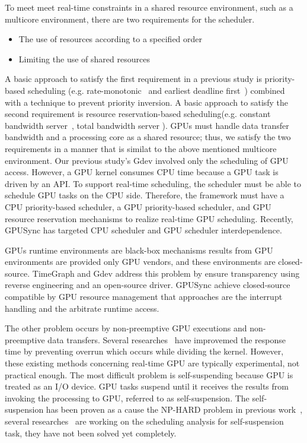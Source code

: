 To meet meet real-time constraints in a shared resource environment, such as a multicore environment,
there are two requirements for the scheduler.
\begin{itemize}
\item The use of resources according to a specified order
\item Limiting the use of shared resources
\end{itemize}
A basic approach to satisfy the first requirement in a previous study is priority-based scheduling (e.g. rate-monotonic~\cite{sched:rm} and earliest deadline first~\cite{sched:edf}) combined with a technique to prevent priority inversion.
A basic approach to satisfy the second requirement is resource reservation-based scheduling(e.g. constant bandwidth server~\cite{rr:cbs}, total bandwidth server\cite{rr:tbs2} ).
GPUs must handle data transfer bandwidth and a processing core as a shared resource; thus, we satisfy the two requirements in a manner that is similat to the above mentioned multicore environment.
Our previous study's Gdev involved only the scheduling of GPU access.
However, a GPU kernel consumes CPU time because a GPU task is driven by an API.
To support real-time scheduling, the scheduler must be able to schedule GPU tasks on the CPU side.
Therefore, the framework must have a CPU priority-based scheduler, a GPU priority-based scheduler, and GPU resource reservation mechanisms to realize real-time GPU scheduling.
Recently, GPUSync has targeted CPU scheduler and GPU scheduler interdependence.


GPUs runtime environments are black-box mechanisms results from GPU environments are provided only GPU vendors, and these environments are closed-source.
TimeGraph and Gdev address this problem by ensure transparency using reverse engineering and an open-source driver.
GPUSync achieve closed-source compatible by GPU resource management that approaches are the interrupt handling and the arbitrate runtime access.

The other problem occurs by non-preemptive GPU executions and non-preemptive data transfers.
Several researches~\cite{basaran:preemptive,sparc} have improvemed the response time by preventing overrun which occurs while dividing the kernel.
However, these existing methods concerning real-time GPU are typically experimental, not practical enough.
The most difficult problem is self-suspending because GPU is treated as an I/O device.
GPU tasks suspend until it receives the results from invoking the processing to GPU, referred to as self-suspension.
The self-suspension has been proven as a cause the NP-HARD problem in previous work~\cite{self-sus:1,self-sus:2},
several researches~\cite{chattopadhyay2014limited,kim2013segment} are working on the scheduling analysis for self-suspension task,
they have not been solved yet completely.

